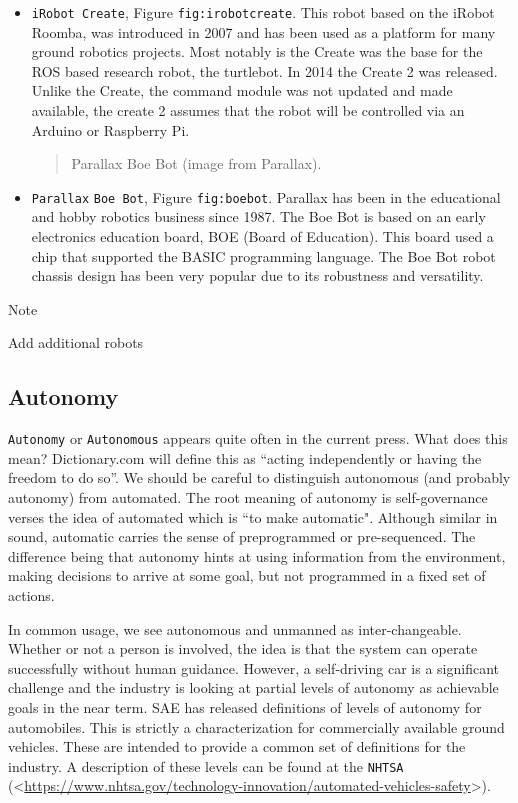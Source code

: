 \begin{itemize}
\item
  \texttt{iRobot\ Create}, Figure \texttt{fig:irobotcreate}. This robot
  based on the iRobot Roomba, was introduced in 2007 and has been used
  as a platform for many ground robotics projects. Most notably is the
  Create was the base for the ROS based research robot, the turtlebot.
  In 2014 the Create 2 was released. Unlike the Create, the command
  module was not updated and made available, the create 2 assumes that
  the robot will be controlled via an Arduino or Raspberry Pi.

  \begin{quote}
  Parallax Boe Bot (image from Parallax).
  \end{quote}
\item
  \texttt{Parallax} \texttt{Boe\ Bot}, Figure \texttt{fig:boebot}.
  Parallax has been in the educational and hobby robotics business since
  1987. The Boe Bot is based on an early electronics education board,
  BOE (Board of Education). This board used a chip that supported the
  BASIC programming language. The Boe Bot robot chassis design has been
  very popular due to its robustness and versatility.
\end{itemize}

Note

Add additional robots

\hypertarget{autonomy}{%
\subsection{Autonomy}\label{autonomy}}

\texttt{Autonomy} or \texttt{Autonomous} appears quite often in the
current press. What does this mean? Dictionary.com will define this as
``acting independently or having the freedom to do so''. We should be
careful to distinguish autonomous (and probably autonomy) from
automated. The root meaning of autonomy is self-governance verses the
idea of automated which is ``to make automatic". Although similar in
sound, automatic carries the sense of preprogrammed or pre-sequenced.
The difference being that autonomy hints at using information from the
environment, making decisions to arrive at some goal, but not programmed
in a fixed set of actions.

In common usage, we see autonomous and unmanned as inter-changeable.
Whether or not a person is involved, the idea is that the system can
operate successfully without human guidance. However, a self-driving car
is a significant challenge and the industry is looking at partial levels
of autonomy as achievable goals in the near term. SAE has released
definitions of levels of autonomy for automobiles. This is strictly a
characterization for commercially available ground vehicles. These are
intended to provide a common set of definitions for the industry. A
description of these levels can be found at the \texttt{NHTSA}
(\textless{}\url{https://www.nhtsa.gov/technology-innovation/automated-vehicles-safety}\textgreater).

